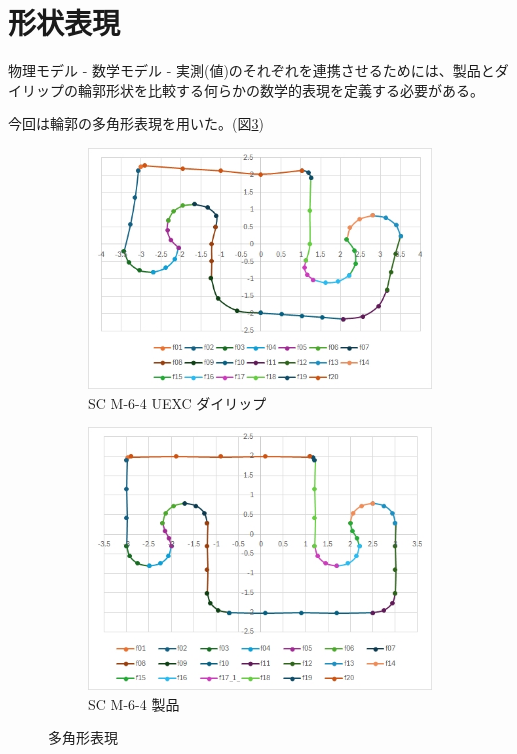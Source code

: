 \documentclass[report]{jlreq}
\begin{document}
\section{形状表現}
物理モデル - 数学モデル - 実測(値)のそれぞれを連携させるためには、製品とダイリップの輪郭形状を比較する何らかの数学的表現を定義する必要がある。

今回は輪郭の多角形表現を用いた。({\small 図\ref{fig:polygon}})

\begin{figure}
  \centering
    \begin{subfigure}{0.45\columnwidth}
      \centering
      \includegraphics[width=\columnwidth]{D05_DieLip.jpg}
      \caption{SC M-6-4 UEXC ダイリップ}
      \label{fig:hidari}
    \end{subfigure}
    \hspace{5mm}
    \begin{subfigure}{0.45\columnwidth}
      \centering
      \includegraphics[width=\columnwidth]{SC_M-6-4_polygon.jpg}
      \caption{SC M-6-4 製品} 
      \label{fig:SC_M-6-4_polygon}
    \end{subfigure}
    \caption{多角形表現}
    \label{fig:polygon} 
\end{figure} 
\end{document}
